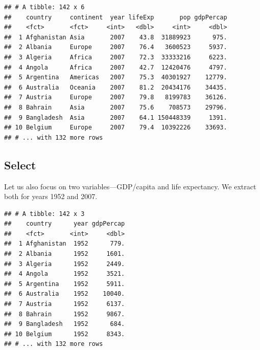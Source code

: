 \documentclass[12pt,]{article}
\newenvironment{Shaded}{\begin{snugshade}}{\end{snugshade}}
\newcommand{\KeywordTok}[1]{\textcolor[rgb]{0.13,0.29,0.53}{\textbf{#1}}}
\newcommand{\DecValTok}[1]{\textcolor[rgb]{0.00,0.00,0.81}{#1}}
\newcommand{\StringTok}[1]{\textcolor[rgb]{0.31,0.60,0.02}{#1}}
\newcommand{\OperatorTok}[1]{\textcolor[rgb]{0.81,0.36,0.00}{\textbf{#1}}}
\newcommand{\NormalTok}[1]{#1}
\begin{document}
\begin{verbatim}
## # A tibble: 142 x 6
##    country     continent  year lifeExp       pop gdpPercap
##    <fct>       <fct>     <int>   <dbl>     <int>     <dbl>
##  1 Afghanistan Asia       2007    43.8  31889923      975.
##  2 Albania     Europe     2007    76.4   3600523     5937.
##  3 Algeria     Africa     2007    72.3  33333216     6223.
##  4 Angola      Africa     2007    42.7  12420476     4797.
##  5 Argentina   Americas   2007    75.3  40301927    12779.
##  6 Australia   Oceania    2007    81.2  20434176    34435.
##  7 Austria     Europe     2007    79.8   8199783    36126.
##  8 Bahrain     Asia       2007    75.6    708573    29796.
##  9 Bangladesh  Asia       2007    64.1 150448339     1391.
## 10 Belgium     Europe     2007    79.4  10392226    33693.
## # ... with 132 more rows
\end{verbatim}

\subsection{Select}\label{select}

Let us also focus on two variables---GDP/capita and life expectancy. We
extract both for years 1952 and 2007.

\begin{Shaded}
\end{Shaded}

\begin{verbatim}
## # A tibble: 142 x 3
##    country      year gdpPercap
##    <fct>       <int>     <dbl>
##  1 Afghanistan  1952      779.
##  2 Albania      1952     1601.
##  3 Algeria      1952     2449.
##  4 Angola       1952     3521.
##  5 Argentina    1952     5911.
##  6 Australia    1952    10040.
##  7 Austria      1952     6137.
##  8 Bahrain      1952     9867.
##  9 Bangladesh   1952      684.
## 10 Belgium      1952     8343.
## # ... with 132 more rows
\end{verbatim}

\begin{Shaded}
\end{Shaded}
\end{document}
